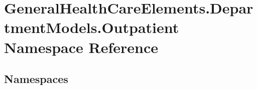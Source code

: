 \hypertarget{namespace_general_health_care_elements_1_1_department_models_1_1_outpatient}{}\section{General\+Health\+Care\+Elements.\+Department\+Models.\+Outpatient Namespace Reference}
\label{namespace_general_health_care_elements_1_1_department_models_1_1_outpatient}
\subsection*{Namespaces}
\begin{DoxyCompactItemize}
\end{DoxyCompactItemize}
